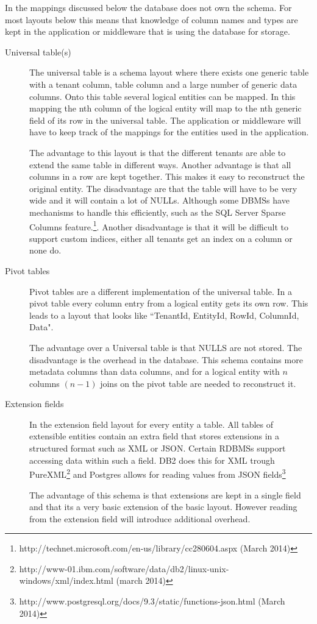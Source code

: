 In the mappings discussed below the database does not own the schema. 
For most layouts below this means that knowledge of column names and types are kept in the application or middleware that is using the database for storage. 
\begin{description}
	\item[Universal table(s)]
		The universal table is a schema layout where there exists one generic table with a tenant column, table column and a large number of generic data columns.
		Onto this table several logical entities can be mapped.
		In this mapping the nth column of the logical entity will map to the nth generic field of its row in the universal table.
		The application or middleware will have to keep track of the mappings for the entities used in the application.

		The advantage to this layout is that the different tenants are able to extend the same table in different ways. 
		Another advantage is that all columns in a row are kept together. 
		This makes it easy to reconstruct the original entity.
		The disadvantage are that the table will have to be very wide and it will contain a lot of NULLs. 
		Although some \acp{DBMS} have mechanisms to handle this efficiently, such as the SQL Server Sparse Columns feature.\footnote{http://technet.microsoft.com/en-us/library/cc280604.aspx (March 2014)}.
		Another disadvantage is that it will be difficult to support custom indices, either all tenants get an index on a column or none do.~\cite{aulbach2008multi}
	\item[Pivot tables]
		Pivot tables are a different implementation of the universal table.
		In a pivot table every column entry from a logical entity gets its own row. 
		This leads to a layout that looks like ``TenantId, EntityId, RowId, ColumnId, Data".

		The advantage over a Universal table is that NULLS are not stored.
		The disadvantage is the overhead in the database. 
		This schema contains more metadata columns than data columns, and for a logical entity with $n$ columns $(n-1)$ joins on the pivot table are needed to reconstruct it.~\cite{aulbach2008multi}
	\item[Extension fields]
		In the extension field layout for every entity a table.
		All tables of extensible entities contain an extra field that stores extensions in a structured format such as XML or JSON.
		Certain \acp{RDBMS} support accessing data within such a field. 
		DB2 does this for XML trough PureXML\footnote{http://www-01.ibm.com/software/data/db2/linux-unix-windows/xml/index.html (march 2014)} and Postgres allows for reading values from JSON fields\footnote{http://www.postgresql.org/docs/9.3/static/functions-json.html (March 2014)}

		The advantage of this schema is that extensions are kept in a single field and that its a very basic extension of the basic layout.
		However reading from the extension field will introduce additional overhead.~\cite{aulbach2009comparison}
\end{description}

